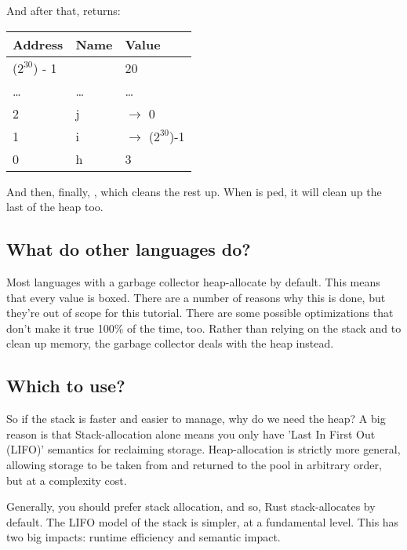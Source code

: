 And after that,  returns:

\begin{table}[H]
  \begin{tabular}{|l|l|l|}
    \hline
    \textbf{Address} & \textbf{Name} & \textbf{Value} \\
    \hline
    ($2^{30}$) - 1 & & 20 \\
    \hline
    \ldots & \ldots & \ldots \\
    \hline
    2 & j & $\rightarrow$ 0 \\
    \hline
    1 & i & $\rightarrow$ ($2^{30}$)-1 \\
    \hline
    0 & h & 3 \\
    \hline
  \end{tabular}
\end{table}

And then, finally, , which cleans the rest up. When  is ped, it will clean up the last of the heap too.

\subsection*{What do other languages do?}

Most languages with a garbage collector heap-allocate by default. This means that every value is boxed. There are a number of reasons 
why this is done, but they're out of scope for this tutorial. There are some possible optimizations that don't make it true 100\% of 
the time, too. Rather than relying on the stack and  to clean up memory, the garbage collector deals with the heap instead.

\subsection*{Which to use?}

So if the stack is faster and easier to manage, why do we need the heap? A big reason is that Stack-allocation alone means you only 
have 'Last In First Out (LIFO)' semantics for reclaiming storage. Heap-allocation is strictly more general, allowing storage to be 
taken from and returned to the pool in arbitrary order, but at a complexity cost.


Generally, you should prefer stack allocation, and so, Rust stack-allocates by default. The LIFO model of the stack is simpler, 
at a fundamental level. This has two big impacts: runtime efficiency and semantic impact.

